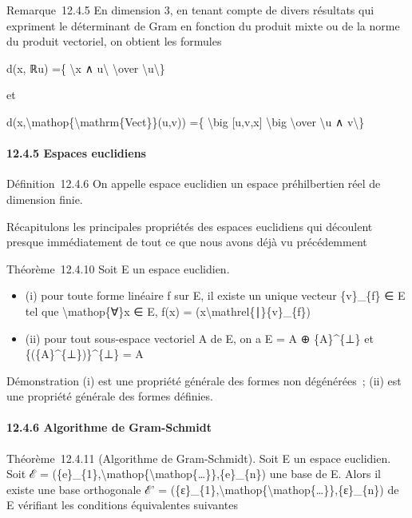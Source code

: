 \documentclass[]{article}
\begin{document}
Remarque~12.4.5 En dimension 3, en tenant compte de divers résultats qui
expriment le déterminant de Gram en fonction du produit mixte ou de la
norme du produit vectoriel, on obtient les formules

d(x, ℝu) =\{ \textbackslash{}\textbar{}x ∧ u\textbackslash{}\textbar{}
\textbackslash{}over
\textbackslash{}\textbar{}u\textbackslash{}\textbar{}\}

et

d(x,\textbackslash{}mathop\{\textbackslash{}mathrm\{Vect\}\}(u,v)) =\{
\textbackslash{}big \textbar{} {[}u,v,x{]} \textbackslash{}big
\textbar{} \textbackslash{}over \textbackslash{}\textbar{}u ∧
v\textbackslash{}\textbar{}\}

\paragraph{12.4.5 Espaces euclidiens}

Définition~12.4.6 On appelle espace euclidien un espace préhilbertien
réel de dimension finie.

Récapitulons les principales propriétés des espaces euclidiens qui
découlent presque immédiatement de tout ce que nous avons déjà vu
précédemment

Théorème~12.4.10 Soit E un espace euclidien.

\begin{itemize}
\itemsep1pt\parskip0pt
\item
  (i) pour toute forme linéaire f sur E, il existe un unique vecteur
  \{v\}\_\{f\} ∈ E tel que \textbackslash{}mathop\{∀\}x ∈ E, f(x) =
  (x\textbackslash{}mathrel\{∣\}\{v\}\_\{f\})
\item
  (ii) pour tout sous-espace vectoriel A de E, on a E = A ⊕
  \{A\}\^{}\{⊥\} et \{(\{A\}\^{}\{⊥\})\}\^{}\{⊥\} = A
\end{itemize}

Démonstration (i) est une propriété générale des formes non dégénérées~;
(ii) est une propriété générale des formes définies.

\paragraph{12.4.6 Algorithme de Gram-Schmidt}

Théorème~12.4.11 (Algorithme de Gram-Schmidt). Soit E un espace
euclidien. Soit ℰ =
(\{e\}\_\{1\},\textbackslash{}mathop\{\textbackslash{}mathop\{\ldots{}\}\},\{e\}\_\{n\})
une base de E. Alors il existe une base orthogonale ℰ' =
(\{ε\}\_\{1\},\textbackslash{}mathop\{\textbackslash{}mathop\{\ldots{}\}\},\{ε\}\_\{n\})
de E vérifiant les conditions équivalentes suivantes
\end{document}
